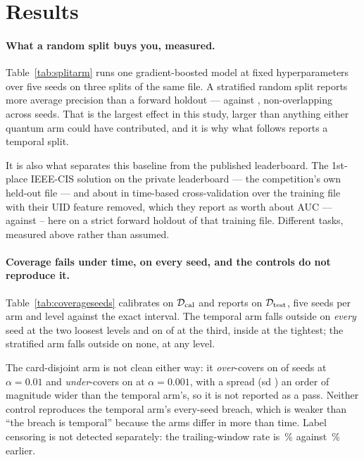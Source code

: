 \section{Results}\label{sec:results}

\paragraph{What a random split buys you, measured.} Table~\ref{tab:splitarm} runs one
gradient-boosted model at fixed hyperparameters over five seeds on three splits of the same
file. A stratified random split reports \ClaimSplitApInflation{} more average precision than a
forward holdout --- \ClaimSplitApStratified{} against \ClaimSplitApTemporal{}, non-overlapping
across seeds. That is the largest effect in this study, larger than anything either quantum arm
could have contributed, and it is why what follows reports a temporal split.

It is also what separates this baseline from the published leaderboard. The 1st-place IEEE-CIS
solution  on the private leaderboard --- the competition's own
held-out file --- and about  in time-based cross-validation over the training
file with their UID feature removed, which they report as worth about  AUC ---
against \ClaimGbdtFullAucMin--\ClaimGbdtFullAucMax{} here on a strict forward holdout of that
training file. Different tasks, measured above rather than assumed.



\paragraph{Coverage fails under time, on every seed, and the controls do not reproduce it.}
Table~\ref{tab:coverageseeds} calibrates on $\mathcal{D}_{\mathrm{cal}}$ and reports on $\mathcal{D}_{\mathrm{test}}$, five seeds per arm
and level against the exact interval. The temporal arm falls outside on \emph{every} seed at the
two loosest levels and on \ClaimTemporalOutsideMid{} of \ClaimCoverageSeeds{} at the third,
inside at the tightest; the stratified arm falls outside on none, at any level.

The card-disjoint arm is not clean either way: it \emph{over}-covers on
\ClaimCardDisjointOutsideLoosest{} of \ClaimCoverageSeeds{} seeds at $\alpha = 0.01$ and
\emph{under}-covers on \ClaimCardDisjointOutsideTightest{} at $\alpha = 0.001$, with a spread
(sd \ClaimCardDisjointSdTightest) an order of magnitude wider than the temporal arm's, so it is
not reported as a pass. Neither control reproduces the temporal arm's every-seed breach, which
is weaker than ``the breach is temporal'' because the arms differ in more than time. Label
censoring is not detected separately: the trailing-window rate is
\ClaimCensoringTrailingRate\,\% against \ClaimCensoringEarlierRate\,\% earlier.


